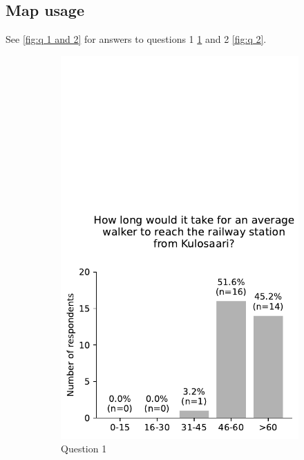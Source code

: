 \subsection{Map usage}

See \ref{fig:q 1 and 2} for answers to questions 1 \ref{fig:q 1} and 2 \ref{fig:q 2}.

\begin{figure}[H]
	\centering
	\begin{subfigure}[b]{0.5\textwidth}
		\centering
		\includegraphics[width=\textwidth]{images/questionnaire/0.pdf}
		\caption{Question 1}
		\label{fig:q 1}
	\end{subfigure}%
	\hfill
	\begin{subfigure}[b]{0.5\textwidth}

\end{subfigure}
\end{figure}
